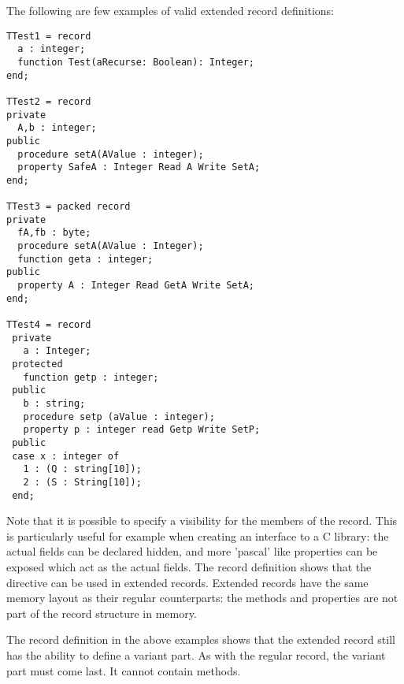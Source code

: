 The following are few examples of valid extended record definitions:
\begin{verbatim}
TTest1 = record
  a : integer;
  function Test(aRecurse: Boolean): Integer;
end;

TTest2 = record
private
  A,b : integer;
public
  procedure setA(AValue : integer);
  property SafeA : Integer Read A Write SetA;
end;

TTest3 = packed record
private
  fA,fb : byte;
  procedure setA(AValue : Integer);
  function geta : integer;
public  
  property A : Integer Read GetA Write SetA;
end;

TTest4 = record
 private
   a : Integer;
 protected  
   function getp : integer; 
 public
   b : string;
   procedure setp (aValue : integer);
   property p : integer read Getp Write SetP;
 public  
 case x : integer of
   1 : (Q : string[10]);
   2 : (S : String[10]);
 end;
\end{verbatim}
Note that it is possible to specify a visibility for the members of the
record. This is particularly useful for example when creating an interface 
to a C library: the actual fields can be declared hidden, and more 'pascal'
like properties can be exposed which act as the actual fields. 
The  record definition shows that the  directive can
be used in extended records. Extended records have the same memory layout as
their regular counterparts: the methods and properties are not part of the
record structure in memory. 

The  record definition in the above examples shows that the
extended record still has the ability to define a variant part. As with the
regular record, the variant part must come last. It cannot contain methods.

